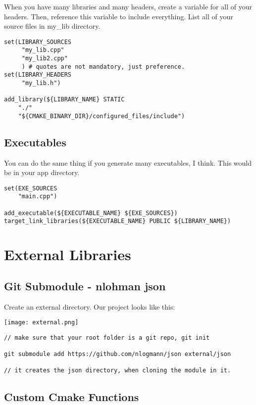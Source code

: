 \documentclass[openany]{report}
\begin{document}
When you have many libraries and many headers, create a variable for all of your headers.
Then, reference this variable to include everything.
List all of your source files in my\_lib directory.

\begin{verbatim}
set(LIBRARY_SOURCES
     "my_lib.cpp"
     "my_lib2.cpp"
     ) # quotes are not mandatory, just preference.
set(LIBRARY_HEADERS
     "my_lib.h")

add_library(${LIBRARY_NAME} STATIC
    "./"
    "${CMAKE_BINARY_DIR}/configured_files/include")
\end{verbatim}

\subsection{Executables}

You can do the same thing if you generate many executables, I think. This would be in your app directory.

\begin{verbatim}
set(EXE_SOURCES
    "main.cpp")

add_executable(${EXECUTABLE_NAME} ${EXE_SOURCES})
target_link_libraries(${EXECUTABLE_NAME} PUBLIC ${LIBRARY_NAME})
\end{verbatim}


\section{External Libraries}


\subsection{Git Submodule - nlohman json}

Create an external directory. Our project looks like this:

\begin{center}
    \texttt{[image: external.png]}
\end{center}

\begin{verbatim}
// make sure that your root folder is a git repo, git init

git submodule add https://github.com/nlogmann/json external/json

// it creates the json directory, when cloning the module in it.
\end{verbatim}

\subsection{Custom Cmake Functions}
\end{document}
